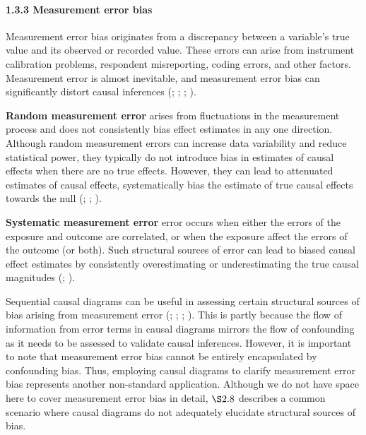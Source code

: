 \documentclass[
  singlecolumn]{article}
\let\oldparagraph\paragraph
\renewcommand{\paragraph}[1]{\oldparagraph{#1}\mbox{}}
\begin{document}
\paragraph{1.3.3 Measurement error bias}\label{measurement-error-bias}

Measurement error bias originates from a discrepancy between a
variable's true value and its observed or recorded value. These errors
can arise from instrument calibration problems, respondent misreporting,
coding errors, and other factors. Measurement error is almost
inevitable, and measurement error bias can significantly distort causal
inferences (;
;
;
).

\textbf{Random measurement error} arises from fluctuations in the
measurement process and does not consistently bias effect estimates in
any one direction. Although random measurement errors can increase data
variability and reduce statistical power, they typically do not
introduce bias in estimates of causal effects when there are no true
effects. However, they can lead to attenuated estimates of causal
effects, systematically bias the estimate of true causal effects towards
the null (;
;
).

\textbf{Systematic measurement error} error occurs when either the
errors of the exposure and outcome are correlated, or when the exposure
affect the errors of the outcome (or both). Such structural sources of
error can lead to biased causal effect estimates by consistently
overestimating or underestimating the true causal magnitudes
(;
).

Sequential causal diagrams can be useful in assessing certain structural
sources of bias arising from measurement error
(;
;
;
). This is
partly because the flow of information from error terms in causal
diagrams mirrors the flow of confounding as it needs to be assessed to
validate causal inferences. However, it is important to note that
measurement error bias cannot be entirely encapsulated by confounding
bias. Thus, employing causal diagrams to clarify measurement error bias
represents another non-standard application. Although we do not have
space here to cover measurement error bias in detail, \(\S 2.8\)
describes a common scenario where causal diagrams do not adequately
elucidate structural sources of bias.
\end{document}
